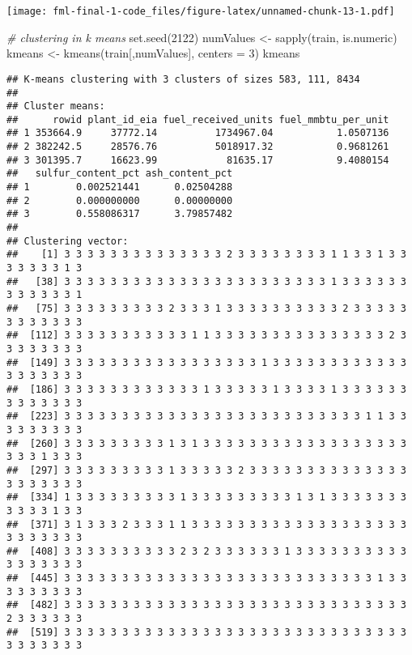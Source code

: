 \documentclass[
]{article}
\newenvironment{Shaded}{\begin{snugshade}}{\end{snugshade}}
\newcommand{\AttributeTok}[1]{\textcolor[rgb]{0.77,0.63,0.00}{#1}}
\newcommand{\CommentTok}[1]{\textcolor[rgb]{0.56,0.35,0.01}{\textit{#1}}}
\newcommand{\DecValTok}[1]{\textcolor[rgb]{0.00,0.00,0.81}{#1}}
\newcommand{\FunctionTok}[1]{\textcolor[rgb]{0.00,0.00,0.00}{#1}}
\newcommand{\NormalTok}[1]{#1}
\newcommand{\OtherTok}[1]{\textcolor[rgb]{0.56,0.35,0.01}{#1}}
\begin{document}
\texttt{[image: fml-final-1-code\_files/figure-latex/unnamed-chunk-13-1.pdf]}

\begin{Shaded}
\begin{Highlighting}[]
\CommentTok{\# clustering in k means}
\FunctionTok{set.seed}\NormalTok{(}\DecValTok{2122}\NormalTok{)}
\NormalTok{numValues }\OtherTok{\textless{}{-}} \FunctionTok{sapply}\NormalTok{(train, is.numeric)}
\NormalTok{kmeans }\OtherTok{\textless{}{-}} \FunctionTok{kmeans}\NormalTok{(train[,numValues], }\AttributeTok{centers =} \DecValTok{3}\NormalTok{)}
\NormalTok{kmeans}
\end{Highlighting}
\end{Shaded}

\begin{verbatim}
## K-means clustering with 3 clusters of sizes 583, 111, 8434
## 
## Cluster means:
##      rowid plant_id_eia fuel_received_units fuel_mmbtu_per_unit
## 1 353664.9     37772.14          1734967.04           1.0507136
## 2 382242.5     28576.76          5018917.32           0.9681261
## 3 301395.7     16623.99            81635.17           9.4080154
##   sulfur_content_pct ash_content_pct
## 1        0.002521441      0.02504288
## 2        0.000000000      0.00000000
## 3        0.558086317      3.79857482
## 
## Clustering vector:
##    [1] 3 3 3 3 3 3 3 3 3 3 3 3 3 3 2 3 3 3 3 3 3 3 3 1 1 3 3 1 3 3 3 3 3 3 3 1 3
##   [38] 3 3 3 3 3 3 3 3 3 3 3 3 3 3 3 3 3 3 3 3 3 3 3 1 3 3 3 3 3 3 3 3 3 3 3 3 1
##   [75] 3 3 3 3 3 3 3 3 3 2 3 3 3 1 3 3 3 3 3 3 3 3 3 3 2 3 3 3 3 3 3 3 3 3 3 3 3
##  [112] 3 3 3 3 3 3 3 3 3 3 3 1 1 3 3 3 3 3 3 3 3 3 3 3 3 3 3 3 2 3 3 3 3 3 3 3 3
##  [149] 3 3 3 3 3 3 3 3 3 3 3 3 3 3 3 3 3 1 3 3 3 3 3 3 3 3 3 3 3 3 3 3 3 3 3 3 3
##  [186] 3 3 3 3 3 3 3 3 3 3 3 3 1 3 3 3 3 3 1 3 3 3 3 1 3 3 3 3 3 3 3 3 3 3 3 3 3
##  [223] 3 3 3 3 3 3 3 3 3 3 3 3 3 3 3 3 3 3 3 3 3 3 3 3 3 3 1 1 3 3 3 3 3 3 3 3 3
##  [260] 3 3 3 3 3 3 3 3 3 1 3 1 3 3 3 3 3 3 3 3 3 3 3 3 3 3 3 3 3 3 3 3 3 1 3 3 3
##  [297] 3 3 3 3 3 3 3 3 3 1 3 3 3 3 3 2 3 3 3 3 3 3 3 3 3 3 3 3 3 3 3 3 3 3 3 3 3
##  [334] 1 3 3 3 3 3 3 3 3 3 1 3 3 3 3 3 3 3 3 3 1 3 1 3 3 3 3 3 3 3 3 3 3 3 1 3 3
##  [371] 3 1 3 3 3 2 3 3 3 1 1 3 3 3 3 3 3 3 3 3 3 3 3 3 3 3 3 3 3 3 3 3 3 3 3 3 3
##  [408] 3 3 3 3 3 3 3 3 3 3 2 3 2 3 3 3 3 3 3 1 3 3 3 3 3 3 3 3 3 3 3 3 3 3 3 3 3
##  [445] 3 3 3 3 3 3 3 3 3 3 3 3 3 3 3 3 3 3 3 3 3 3 3 3 3 3 3 1 3 3 3 3 3 3 3 3 3
##  [482] 3 3 3 3 3 3 3 3 3 3 3 3 3 3 3 3 3 3 3 3 3 3 3 3 3 3 3 3 3 3 2 3 3 3 3 3 3
##  [519] 3 3 3 3 3 3 3 3 3 3 3 3 3 3 3 3 3 3 3 3 3 3 3 3 3 3 3 3 3 3 3 3 3 3 3 3 3

\end{verbatim}
\end{document}
